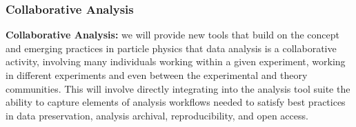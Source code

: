 \begin{frame}
\frametitle{Collaborative Analysis}

\textbf{Collaborative Analysis:}
we will provide new tools that build on the concept and emerging practices
in particle physics that data analysis is a collaborative activity, involving
many individuals working within a given experiment, working in different
experiments and even between the experimental and theory communities.
This will involve directly integrating into the analysis tool suite the
ability to capture elements of analysis workflows needed to satisfy
best practices in data preservation, analysis archival, reproducibility,
and open access.


\end{frame}


